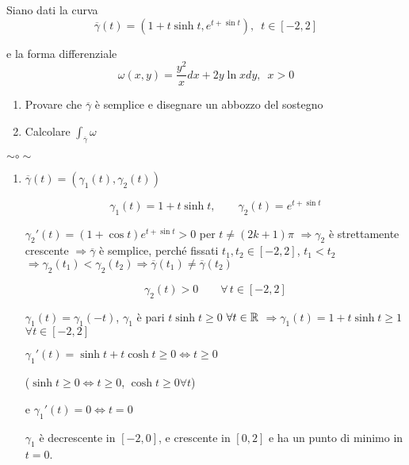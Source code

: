 \begin{exbar}
\begin{example}
	Siano dati la curva 
	\begin{equation*}
		\overline{\gamma}(t)=(1+t \sinh t, e^{t+\sin t}), \,\,\, t \in [-2,2]
	\end{equation*}
	
	e la forma differenziale
	\begin{equation*}
		\omega(x,y)=\frac{y^2}{x} dx+2y \ln x dy,\,\,\, x >0
	\end{equation*}
	
	\begin{enumerate}
		\item Provare che $\overline{\gamma}$ è semplice e disegnare un abbozzo del sostegno
		\item Calcolare $\int_{\overline{\gamma}}\omega$
	\end{enumerate}
	
	{\centering $\sim \circ \sim$ \par}
	
	\begin{enumerate}
		\item $\overline{\gamma}(t)=(\gamma_1(t),\gamma_2(t))$
		
		$$\gamma_1(t)=1+t \sinh t, \qquad \gamma_2 (t)=e^{t+\sin t}$$
		
		$\gamma_2' (t)=(1+\cos t) e^{t+\sin t} >0$ per $ t \neq (2k+1)\pi$ $\Rightarrow \gamma_2$ è strettamente crescente $\Rightarrow \overline{\gamma}$ è semplice, perché fissati $t_1, t_2 \in [-2,2]$, $t_1< t_2$ $\Rightarrow \gamma_2(t_1)< \gamma_2(t_2)\Rightarrow \overline{\gamma}(t_1)\neq \overline{\gamma}(t_2)$
		
		$$\gamma_2 (t)>0 \qquad \forall \, t \in [-2,2]$$
		
		$\gamma_1 (t)= \gamma_1(-t)$, $\gamma_1$ è pari $t\sinh t \geq 0$ $\forall t \in \mathbb{R}$	$\Rightarrow \gamma_1(t)= 1+t \sinh t \geq 1$ $\forall t \in [-2,2]$
		
		{\centering
			$\gamma_1' (t)=\sinh t + t \cosh t \geq 0 \iff t \geq 0$
		
			{\color{blue}
				($\sinh t \geq 0 \Leftrightarrow t \geq 0$, $\cosh t \geq 0 \forall t$)}
			
			e $\gamma_1' (t)=0 \Leftrightarrow t=0$
		\par} 
		
		$\gamma_1$ è decrescente in $[-2,0]$, e crescente in $[0,2]$ e ha un punto di minimo in $t=0$.
		
		\segnaposto %
		

\end{enumerate}
\end{example}
\end{exbar}
